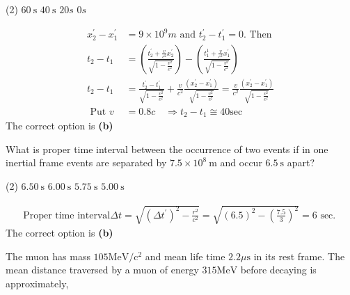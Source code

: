 \begin{enumerate}
\begin{minipage}{\textwidth}
\end{minipage}
\begin{tasks}(2)
	\task[\textbf{A.}] $60 \mathrm{~s}$
	\task[\textbf{B.}]$40 \mathrm{~s}$
	\task[\textbf{C.}]$20 s$
	\task[\textbf{D.}] $0 s$
\end{tasks}
\begin{answer}
	\begin{align*}
	x_{2}^{\prime}-x_{1}^{\prime}&=9 \times 10^{9} m \text { and } t_{2}^{\prime}-t_{1}^{\prime}=0 . \text { Then }\\
	t_{2}-t_{1}&=\left(\frac{t_{2}^{\prime}+\frac{v}{c^{2}} x_{2}^{\prime}}{\sqrt{1-\frac{v^{2}}{c^{2}}}}\right)-\left(\frac{t_{1}^{1}+\frac{v}{c^{2}} x_{1}^{\prime}}{\sqrt{1-\frac{v^{2}}{c^{2}}}}\right)\\
	t_{2}-t_{1}&=\frac{t_{2}^{\prime}-t_{1}^{\prime}}{\sqrt{1-\frac{v^{2}}{c^{2}}}}+\frac{v}{c^{2}} \frac{\left(x_{2}^{\prime}-x_{1}^{\prime}\right)}{\sqrt{1-\frac{v^{2}}{c^{2}}}}=\frac{v}{c^{2}} \frac{\left(x_{2}^{\prime}-x_{1}^{\prime}\right)}{\sqrt{1-\frac{v^{2}}{c^{2}}}}\\
	\text { Put } v&=0.8 c \quad \Rightarrow t_{2}-t_{1} \cong 40 \mathrm{sec}
	\end{align*}
	The correct option is \textbf{(b)}
\end{answer}
\begin{minipage}{\textwidth}
	\item What is proper time interval between the occurrence of two events if in one inertial frame events are separated by $7.5 \times 10^{8} \mathrm{~m}$ and occur $6.5 \mathrm{~s}$ apart?
\end{minipage}
\begin{tasks}(2)
	\task[\textbf{A.}] $6.50 \mathrm{~s}$
	\task[\textbf{B.}]$6.00 \mathrm{~s}$
	\task[\textbf{C.}]$5.75 \mathrm{~s}$
	\task[\textbf{D.}]$5.00 \mathrm{~s}$
\end{tasks}
\begin{answer}
	\begin{align*}
	\text{Proper time interval}
	\Delta t=\sqrt{\left(\Delta t^{\prime}\right)^{2}-\frac{r^{2}}{c^{2}}}=\sqrt{(6.5)^{2}-\left(\frac{7.5}{3}\right)^{2}}=6 \text { sec. }
	\end{align*}
	The correct option is \textbf{(b)}
\end{answer}
\begin{minipage}{\textwidth}
	\item The muon has mass $105 \mathrm{MeV} / \mathrm{c}^{2}$ and mean life time $2.2 \mu \mathrm{s}$ in its rest frame. The mean distance traversed by a muon of energy $315 \mathrm{MeV}$ before decaying is approximately,

\end{minipage}
\end{enumerate}
